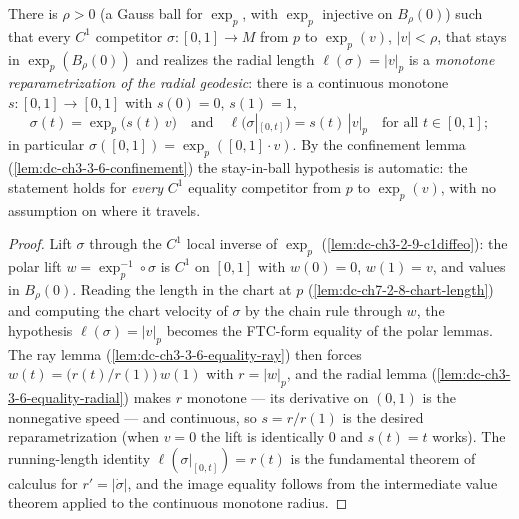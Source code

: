 \begin{lemma}
  \label{lem:dc-ch3-3-6-equality-manifold}
  \leanok
  There is $\rho>0$ (a Gauss ball for $\exp_p$, with $\exp_p$ injective on
  $B_\rho(0)$) such that every $C^1$ competitor $\sigma:[0,1]\to M$ from $p$
  to $\exp_p(v)$, $|v|<\rho$, that stays in $\exp_p(B_\rho(0))$ and realizes
  the radial length $\ell(\sigma)=|v|_p$ is a \emph{monotone reparametrization
  of the radial geodesic}: there is a continuous monotone
  $s:[0,1]\to[0,1]$ with $s(0)=0$, $s(1)=1$,
  $$\sigma(t)=\exp_p\big(s(t)\,v\big)\quad\text{and}\quad
    \ell\big(\sigma|_{[0,t]}\big)=s(t)\,|v|_p\quad\text{for all }t\in[0,1];$$
  in particular $\sigma([0,1])=\exp_p([0,1]\cdot v)$. By the confinement lemma
  (\cref{lem:dc-ch3-3-6-confinement}) the stay-in-ball hypothesis is
  automatic: the statement holds for \emph{every} $C^1$ equality competitor
  from $p$ to $\exp_p(v)$, with no assumption on where it travels.
\end{lemma}
\begin{proof}
  \sketch
  \leanok
  Lift $\sigma$ through the $C^1$ local inverse of $\exp_p$
  (\cref{lem:dc-ch3-2-9-c1diffeo}): the polar lift
  $w=\exp_p^{-1}\circ\sigma$ is $C^1$ on $[0,1]$ with $w(0)=0$, $w(1)=v$, and
  values in $B_\rho(0)$. Reading the length in the chart at $p$
  (\cref{lem:dc-ch7-2-8-chart-length}) and computing the chart velocity of
  $\sigma$ by the chain rule through $w$, the hypothesis
  $\ell(\sigma)=|v|_p$ becomes the FTC-form equality of the polar lemmas.
  The ray lemma (\cref{lem:dc-ch3-3-6-equality-ray}) then forces
  $w(t)=\big(r(t)/r(1)\big)\,w(1)$ with $r=|w|_p$, and the radial lemma
  (\cref{lem:dc-ch3-3-6-equality-radial}) makes $r$ monotone — its derivative
  on $(0,1)$ is the nonnegative speed — and continuous, so
  $s=r/r(1)$ is the desired reparametrization (when $v=0$ the lift is
  identically $0$ and $s(t)=t$ works). The running-length identity
  $\ell(\sigma|_{[0,t]})=r(t)$ is the fundamental theorem of calculus for
  $r'=|\dot\sigma|$, and the image equality follows from the intermediate
  value theorem applied to the continuous monotone radius.
\end{proof}

